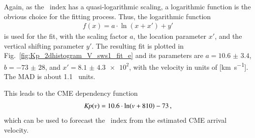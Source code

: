 Again, as the \Kp~index has a quasi-logarithmic scaling, a logarithmic function is the obvious choice for the fitting process. Thus, the logarithmic function
\begin{align}
	f(x) = a \cdot \ln\left(x + x'\right) + y'	\label{eq:log_offset_fit_function}
\end{align}
is used for the fit, with the scaling factor $a$, the location parameter $x'$, and the vertical shifting parameter $y'$. The resulting fit is plotted in Fig.~\ref{fig:Kp_2dhistogram_V_sws1_fit_e} and its parameters are $a = \num{10.6(34)}$, $b = \num{-73(28)}$, and $x' = \num{8.1(43)e2}$, with the velocity in units of [\si{\km\per\s}]. The MAD is about 1.1~\Kp{} units.
\begin{figure}
\end{figure}
This leads to the CME dependency function
\begin{align}
	\textit{Kp}(v) = 10.6 \cdot \ln(v + 810) - 73	\,,	\label{eq:kpvsv_dependency_function}
\end{align}
which can be used to forecast the \Kp{}~index from the estimated CME arrival velocity.

